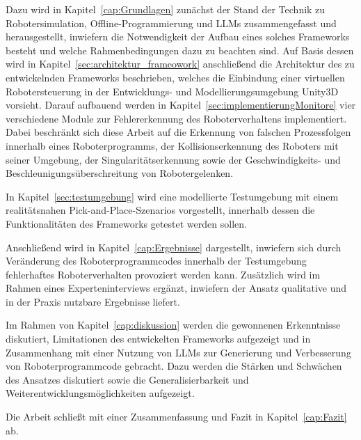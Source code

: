 Dazu wird in Kapitel~\ref{cap:Grundlagen} zunächst der Stand
der Technik zu
Robotersimulation, Offline‑Programmierung und LLMs zusammengefasst und
herausgestellt, inwiefern die Notwendigkeit der Aufbau eines solches Frameworks
besteht und welche Rahmenbedingungen dazu zu beachten sind.
Auf Basis dessen wird in Kapitel~\ref{sec:architektur_frameowork}
anschließend die Architektur des zu entwickelnden Frameworks
beschrieben, welches die Einbindung einer virtuellen Robotersteuerung
in der Entwicklungs- und Modellierungsumgebung Unity3D vorsieht.
Darauf aufbauend werden in Kapitel~\ref{sec:implementierungMonitore}
vier verschiedene Module zur Fehlererkennung des Roboterverhaltens
implementiert. Dabei beschränkt sich diese Arbeit auf die Erkennung von falschen
Prozessfolgen innerhalb eines Roboterprogramms, der
Kollisionserkennung des Roboters mit seiner Umgebung, der
Singularitätserkennung sowie der Geschwindigkeits- und
Beschleunigungsüberschreitung von Robotergelenken.

In Kapitel~\ref{sec:testumgebung} wird eine modellierte Testumgebung mit einem
realitätsnahen Pick-and-Place-Szenarios vorgestellt, innerhalb dessen die
Funktionalitäten des Frameworks getestet werden sollen.

Anschließend wird in Kapitel~\ref{cap:Ergebnisse} dargestellt,
inwiefern sich durch Veränderung des
Roboterprogrammcodes innerhalb der Testumgebung fehlerhaftes
Roboterverhalten provoziert werden kann. Zusätzlich wird im Rahmen eines
Experteninterviews ergänzt, inwiefern der Ansatz qualitative und in
der Praxis nutzbare Ergebnisse liefert.

Im Rahmen von Kapitel~\ref{cap:diskussion} werden die gewonnenen
Erkenntnisse diskutiert, Limitationen des entwickelten Frameworks
aufgezeigt und in
Zusammenhang mit einer Nutzung von LLMs zur Generierung und
Verbesserung von Roboterprogrammcode gebracht. Dazu werden die Stärken und
Schwächen des Ansatzes diskutiert sowie die Generalisierbarkeit und
Weiterentwicklungsmöglichkeiten aufgezeigt.

Die Arbeit schließt mit einer Zusammenfassung und Fazit in
Kapitel~\ref{cap:Fazit} ab.
